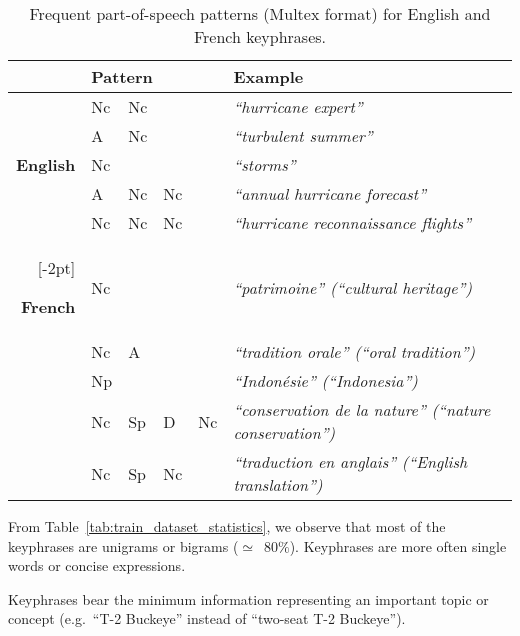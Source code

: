     \begin{table*}
      \centering
      \begin{tabular}{@{~}rl@{~~}l@{~~}l@{~~}ll@{~}}
        \toprule
        & \multicolumn{4}{l}{\hspace{-.5em}\textbf{Pattern}} & \textbf{Example}\\
        \midrule
        \multirow{5}{*}[-2pt]{\begin{sideways}\textbf{English}\end{sideways}} & Nc & Nc & & & \textit{``hurricane expert''}\\ %
        & A & Nc & & & \textit{``turbulent summer''}\\ %
        & Nc & & & & \textit{``storms''}\\ %
        & A & Nc & Nc & & \textit{``annual hurricane forecast''}\\ %
        & Nc & Nc & Nc & & \textit{``hurricane reconnaissance flights''}\\ %
        \addlinespace[1.5\defaultaddspace]
        \multirow{5}{*}[-2pt]{\begin{sideways}\textbf{French}\end{sideways}} & Nc & & & & \textit{``patrimoine'' (``cultural heritage'')}\\ %
        & Nc & A & & & \textit{``tradition orale'' (``oral tradition'')}\\ %
        & Np & & & & \textit{``Indonésie'' (``Indonesia'')}\\ %
        & Nc & Sp & D & Nc & \textit{``conservation de la nature'' (``nature conservation'')}\\ %
        & Nc & Sp & Nc & & \textit{``traduction en anglais'' (``English translation'')}\\ %
        \bottomrule
      \end{tabular}
      \caption{Frequent part-of-speech patterns (Multex format) for English and
               French keyphrases. \label{tab:best_patterns}}
    \end{table*}

    From Table~\ref{tab:train_dataset_statistics}, we observe that most of the
    keyphrases are unigrams or bigrams ($\simeq$~$80\%$). Keyphrases are more
    often single words or concise expressions.
    
    \begin{property}\label{prop:informativity}
      Keyphrases bear the minimum information representing an important topic or
      concept (e.g.~``T-2 Buckeye'' instead of ``two-seat T-2 Buckeye'').
    \end{property}

